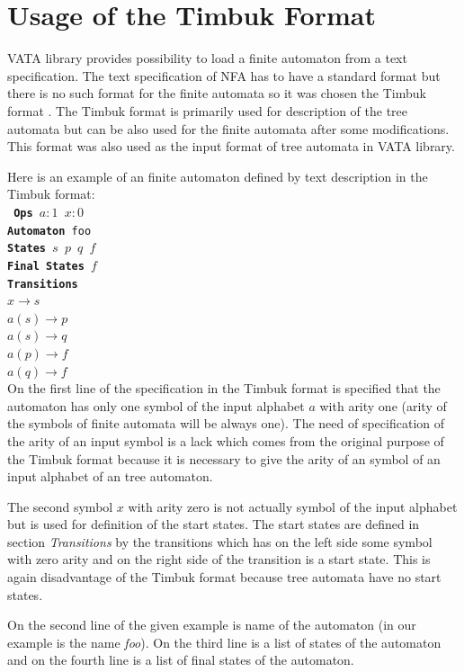 \section{Usage of the Timbuk Format}
\label{usageTimbuk}
VATA library provides possibility to load a finite automaton from a text specification. 
The text specification of NFA has to have a standard format but there is no such format for the finite automata so it was chosen
the Timbuk format \cite{timbuk}. The Timbuk format is primarily used for description of the tree automata but can be also used for the finite automata
after some modifications. This format was also used as the input format of tree automata in VATA library.

Here is an example of an finite automaton defined by text description in the Timbuk format:\\
\texttt {
  \textbf{Ops} $a:1$ $x:0$\\
  \textbf{Automaton} foo\\
  \textbf{States} $s$ $p$ $q$ $f$\\
  \textbf{Final States} $f$\\
  \textbf{Transitions}\\
  \indent $x \rightarrow s$\\
  \indent $a(s) \rightarrow p$\\
  \indent $a(s) \rightarrow q$\\
  \indent $a(p) \rightarrow f$\\
  \indent $a(q) \rightarrow f$\\
}
On the first line of the specification in the Timbuk format
is specified that the automaton has only one symbol of the input alphabet $a$ with arity one (arity of the symbols of finite automata will
be always one). 
The need of specification of the arity of an input symbol is a lack which comes from the original purpose of the Timbuk format because it is necessary 
to give the arity of an symbol of an input alphabet of an tree automaton.

The second symbol $x$ with arity zero is not actually symbol of the input alphabet but is used for definition of the start states. The
start states are defined in section \emph{Transitions} by the transitions which has on the left side some symbol with zero arity and on the
right side of the transition is a start state. This is again disadvantage
of the Timbuk format because tree automata have no start states.

On the second line of the given example is name of the automaton (in our example is the name \emph{foo}). 
On the third line is a list of states of the automaton and on the fourth line is a list of final states of the automaton.

